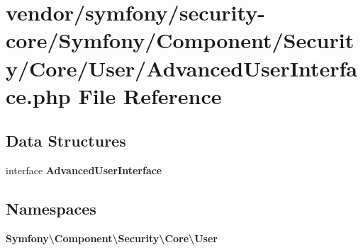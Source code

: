 \section{vendor/symfony/security-\/core/\+Symfony/\+Component/\+Security/\+Core/\+User/\+Advanced\+User\+Interface.php File Reference}
\label{_advanced_user_interface_8php}
\subsection*{Data Structures}
\begin{DoxyCompactItemize}
\item 
interface {\bf Advanced\+User\+Interface}
\end{DoxyCompactItemize}
\subsection*{Namespaces}
\begin{DoxyCompactItemize}
\item 
 {\bf Symfony\textbackslash{}\+Component\textbackslash{}\+Security\textbackslash{}\+Core\textbackslash{}\+User}
\end{DoxyCompactItemize}
